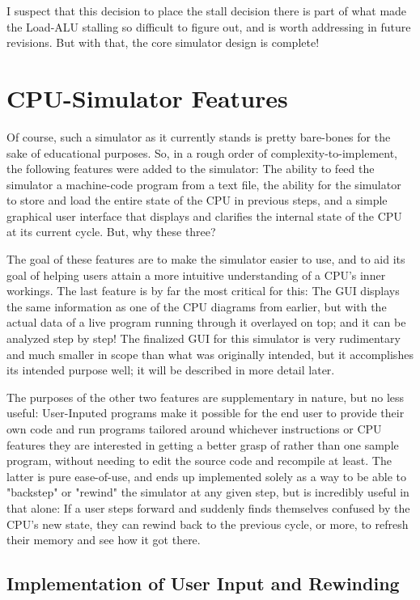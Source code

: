 \documentclass[12pt,twoside]{reedthesis}
\begin{document}
I suspect that this decision to place the stall decision there is part of what made the Load-ALU stalling so difficult to figure out, and is worth addressing in future revisions. But with that, the core simulator design is complete!

\section{CPU-Simulator Features}

Of course, such a simulator as it currently stands is pretty bare-bones for the sake of educational purposes. So, in a rough order of complexity-to-implement, the following features were added to the simulator: The ability to feed the simulator a machine-code program from a text file, the ability for the simulator to store and load the entire state of the CPU in previous steps, and a simple graphical user interface that displays and clarifies the internal state of the CPU at its current cycle. But, why these three?

The goal of these features are to make the simulator easier to use, and to aid its goal of helping users attain a more intuitive understanding of a CPU's inner workings. The last feature is by far the most critical for this: The GUI displays the same information as one of the CPU diagrams from earlier, but with the actual data of a live program running through it overlayed on top; and it can be analyzed step by step! The finalized GUI for this simulator is very rudimentary and much smaller in scope than what was originally intended, but it accomplishes its intended purpose well; it will be described in more detail later.

The purposes of the other two features are supplementary in nature, but no less useful: User-Inputed programs make it possible for the end user to provide their own code and run programs tailored around whichever instructions or CPU features they are interested in getting a better grasp of rather than one sample program, without needing to edit the source code and recompile at least. The latter is pure ease-of-use, and ends up implemented solely as a way to be able to "backstep" or "rewind" the simulator at any given step, but is incredibly useful in that alone: If a user steps forward and suddenly finds themselves confused by the CPU's new state, they can rewind back to the previous cycle, or more, to refresh their memory and see how it got there.

\subsection{Implementation of User Input and Rewinding}
\end{document}
